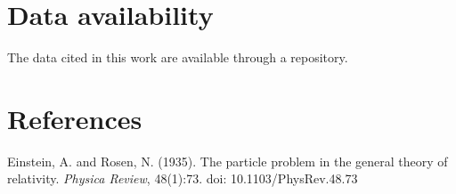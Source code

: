 \documentclass[
]{article}
\begin{document}
\hypertarget{data-availability}{%
\section{Data availability}\label{data-availability}}

The data cited in this work are available through a repository.

\hypertarget{section}{%
\section{}\label{section}}

\hypertarget{references}{%
\section{References}\label{references}}

Einstein, A. and Rosen, N. (1935). The particle problem in the general theory of relativity. \emph{Physica Review}, 48(1):73. doi: 10.1103/PhysRev.48.73
\end{document}
